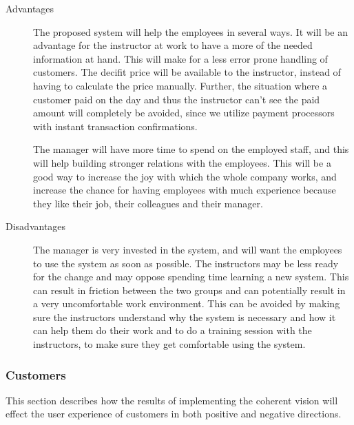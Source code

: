 \begin{description}
\item[Advantages]
The proposed system will help the employees in several ways. It will be an
advantage for the instructor at work to have a more of the needed information
at hand. This will make for a less error prone handling of customers. The 
decifit price will be available to the instructor, instead of having to 
calculate the price manually. Further, the situation where a customer paid on 
the day and thus the instructor can't see the paid amount will completely be 
avoided, since we utilize payment processors with instant transaction 
confirmations.

The manager will have more time to spend on the employed staff, and this will
help building stronger relations with the employees. This will be a
good way to increase the joy with which the whole company works, and increase
the chance for having employees with much experience because they like their 
job, their colleagues and their manager.

\item[Disadvantages]
The manager is very invested in the system, and will want the employees to 
use the system as soon as possible. The instructors may be less ready for the change and may
oppose spending time learning a new system. This can result in friction between
the two groups and can potentially result in a very uncomfortable work 
environment. This can be avoided by making sure the instructors understand why 
the system is necessary and how it can help them do their work and to do a 
training session with the instructors, to make sure they get comfortable using
the system.
\end{description}

\subsubsection{Customers}
This section describes how the results of implementing the coherent vision will 
effect the user experience of customers in both positive and negative 
directions.

